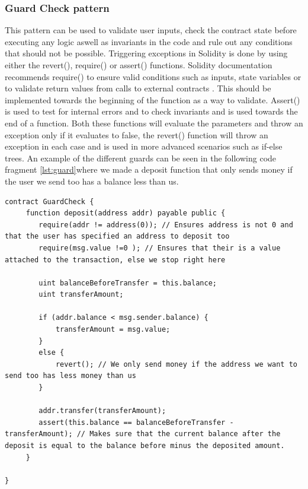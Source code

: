 \documentclass[sigconf]{acmart}
\begin{document}
\subsubsection{Guard Check pattern}
This pattern can be used to validate user inputs, check the contract state before executing any logic aswell as invariants in the code and rule out any conditions that should not be possible. Triggering exceptions in Solidity is done by using either the revert(), require() or assert() functions. Solidity documentation recommends require() to ensure valid conditions such as inputs, state variables or to validate return values from calls to external contracts \cite{solidity}. This should be implemented towards the beginning of the function as a way to validate. Assert() is used to test for internal errors and to check invariants and is used towards the end of a function. Both these functions will evaluate the parameters and throw an exception only if it evaluates to false, the revert() function will throw an exception in each case and is used in more advanced scenarios such as if-else trees. An example of the different guards can be seen in the following code fragment \ref{lst:guard}where we made a deposit function that only sends money if the user we send too has a balance less than us\cite{guardcheck}. 


\begin{lstlisting}[language=Solidity, caption=Guard Check pattern, label={lst:guard}]
contract GuardCheck {
     function deposit(address addr) payable public {
        require(addr != address(0)); // Ensures address is not 0 and that the user has specified an address to deposit too
        require(msg.value !=0 ); // Ensures that their is a value attached to the transaction, else we stop right here
        
        uint balanceBeforeTransfer = this.balance;
        uint transferAmount;
        
        if (addr.balance < msg.sender.balance) {
            transferAmount = msg.value;
        }
        else {
            revert(); // We only send money if the address we want to send too has less money than us
        }
        
        addr.transfer(transferAmount);
        assert(this.balance == balanceBeforeTransfer - transferAmount); // Makes sure that the current balance after the deposit is equal to the balance before minus the deposited amount. 
     }
     
}
\end{lstlisting}
\end{document}
